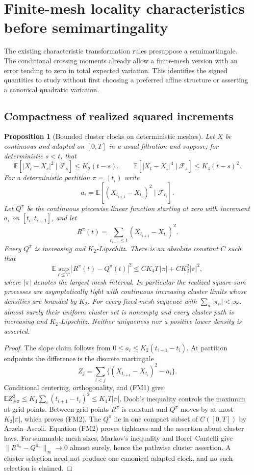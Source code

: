 \documentclass[11pt]{article}
\newtheorem{proposition}[theorem]{Proposition}
\theoremstyle{definition}\newtheorem{definition}[theorem]{Definition}
\theoremstyle{remark}\newtheorem{remark}[theorem]{Remark}
\begin{document}
\section{Finite-mesh locality characteristics before semimartingality}
\label{sec:finite-mesh-locality}

The existing characteristic transformation rules presuppose a
semimartingale. The conditional crossing moments already allow a
finite-mesh version with an error tending to zero in total expected
variation. This identifies the signed quantities to study without
first choosing a preferred affine structure or asserting a canonical
quadratic variation.

\subsection{Compactness of realized squared increments}

\begin{proposition}[Bounded cluster clocks on deterministic meshes]
\label{prop:finite-mesh-square-clocks}
Let $X$ be continuous and adapted on $[0,T]$ in a usual filtration and
suppose, for deterministic $s<t$, that
\[
 \mathbb E[|X_t-X_s|^2\mid\mathcal F_s]\le K_2(t-s),\qquad
 \mathbb E[|X_t-X_s|^4\mid\mathcal F_s]\le K_4(t-s)^2.
 \tag{FM1}
\]
For a deterministic partition $\pi=(t_i)$ write
\[
 a_i=\mathbb E[(X_{t_{i+1}}-X_{t_i})^2\mid\mathcal F_{t_i}].
\]
Let $Q^\pi$ be the continuous piecewise linear function starting at
zero with increment $a_i$ on $[t_i,t_{i+1}]$, and let
\[
 R^\pi(t)=\sum_{t_{i+1}\le t}(X_{t_{i+1}}-X_{t_i})^2.
\]
Every $Q^\pi$ is increasing and $K_2$-Lipschitz. There is an absolute
constant $C$ such that
\[
 \mathbb E\sup_{t\le T}|R^\pi(t)-Q^\pi(t)|^2
 \le C K_4T\,|\pi|+C K_2^2|\pi|^2,
 \tag{FM2}
\]
where $|\pi|$ denotes the largest mesh interval. In particular the
realized square-sum processes are asymptotically tight with continuous
increasing cluster limits whose densities are bounded by $K_2$.
For every fixed mesh sequence with $\sum_n|\pi_n|<\infty$, almost
surely their uniform cluster set is nonempty and every cluster path
is increasing and $K_2$-Lipschitz.
Neither uniqueness nor a positive lower density is asserted.
\end{proposition}
\begin{proof}
The slope claim follows from $0\le a_i\le K_2(t_{i+1}-t_i)$.
At partition endpoints the difference is the discrete martingale
\[
 Z_j=\sum_{i<j}\{(X_{t_{i+1}}-X_{t_i})^2-a_i\}.
\]
Conditional centering, orthogonality, and (FM1) give
$\mathbb EZ_{\#\pi}^2\le K_4\sum_i(t_{i+1}-t_i)^2
\le K_4T|\pi|$.
Doob's inequality controls the maximum at grid points. Between grid
points $R^\pi$ is constant and $Q^\pi$ moves by at most $K_2|\pi|$,
which proves (FM2). The $Q^\pi$ lie in one compact subset of
$C([0,T])$ by Arzela--Ascoli. Equation (FM2) proves tightness and
the assertion about cluster laws. For summable mesh sizes,
Markov's inequality and Borel--Cantelli give
$\|R^{\pi_n}-Q^{\pi_n}\|_\infty\to0$ almost surely, hence the
pathwise cluster assertion. A cluster selection need not produce
one canonical adapted clock, and no such selection is claimed.
\end{proof}
\end{document}
